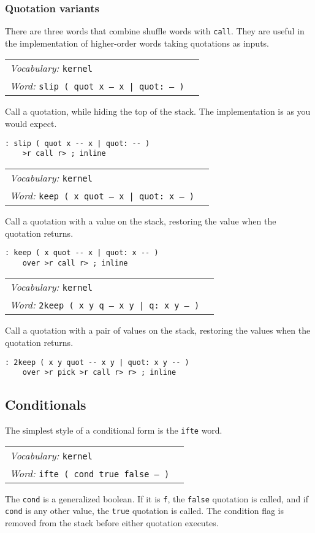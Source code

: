 \documentclass{book}
\newcommand{\vocabulary}[1]{\emph{Vocabulary:} \texttt{#1}&\\}
\newcommand{\ordinaryword}[2]{\index{\texttt{#1}}\emph{Word:} \texttt{#2}&\\}
\newcommand{\wordtable}[1]{

\begin{tabularx}{12cm}[t]{lX}
\hline
#1
\hline
\end{tabularx}

}
\begin{document}
\subsubsection{Quotation variants}

There are three words that combine shuffle words with \texttt{call}. They are useful in the implementation of higher-order words taking quotations as inputs.
\wordtable{
\vocabulary{kernel}
\ordinaryword{slip}{slip ( quot x -- x | quot: -- )}
}
Call a quotation, while hiding the top of the stack. The implementation is as you would expect.
\begin{verbatim}
: slip ( quot x -- x | quot: -- )
    >r call r> ; inline
\end{verbatim}
\wordtable{
\vocabulary{kernel}
\ordinaryword{keep}{keep ( x quot -- x | quot:~x -- )}
}
Call a quotation with a value on the stack, restoring the value when the quotation returns.
\begin{verbatim}
: keep ( x quot -- x | quot: x -- )
    over >r call r> ; inline
\end{verbatim}
\wordtable{
\vocabulary{kernel}
\ordinaryword{2keep}{2keep ( x y q -- x y | q:~x y -- )}
}
Call a quotation with a pair of values on the stack, restoring the values when the quotation returns.
\begin{verbatim}
: 2keep ( x y quot -- x y | quot: x y -- )
    over >r pick >r call r> r> ; inline
\end{verbatim}

\subsection{Conditionals}

The simplest style of a conditional form is the \texttt{ifte} word.
\wordtable{
\vocabulary{kernel}
\ordinaryword{ifte}{ifte ( cond true false -- )}
}
The \texttt{cond} is a generalized boolean. If it is \texttt{f}, the \texttt{false} quotation is called, and if \texttt{cond} is any other value, the \texttt{true} quotation is called. The condition flag is removed from the stack before either quotation executes.
\end{document}
